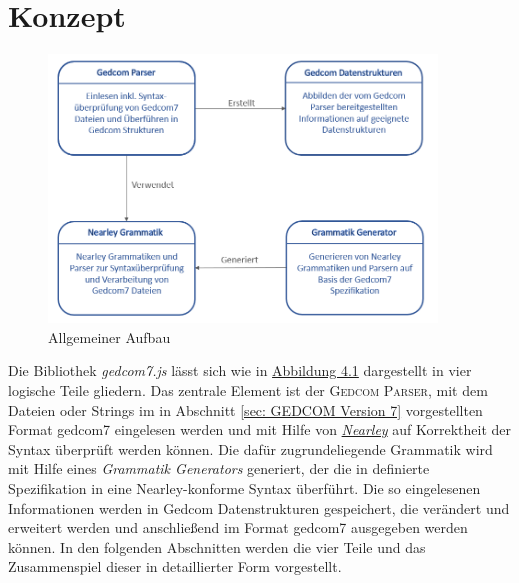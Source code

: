 \chapter{Konzept}
\label{chap: Konzept}

\begin{figure}[b]
	\centering
	\includegraphics[width=0.92\textwidth]{images/konzept_allgemein.png}
	\caption{Allgemeiner Aufbau}
	\label{fig: Allgemeiner Aufbau}
\end{figure}

Die Bibliothek \textit{gedcom7.js} lässt sich wie in \hyperref[fig: Allgemeiner Aufbau]{Abbildung 4.1} dargestellt in vier logische Teile gliedern. Das zentrale Element ist der \textsc{Gedcom Parser}, mit dem Dateien oder Strings im in Abschnitt \ref{sec: GEDCOM Version 7} vorgestellten Format gedcom7 eingelesen werden und mit Hilfe von \hyperref[sec: Nearley]{\textit{Nearley}} auf Korrektheit der Syntax überprüft werden können. Die dafür zugrundeliegende Grammatik wird mit Hilfe eines \textit{Grammatik Generators} generiert, der die in \cite{GEDCOM} definierte Spezifikation in eine Nearley-konforme Syntax überführt. Die so eingelesenen Informationen werden in Gedcom Datenstrukturen gespeichert, die verändert und erweitert werden und anschließend im Format gedcom7 ausgegeben werden können. In den folgenden Abschnitten werden die vier Teile und das Zusammenspiel dieser in detaillierter Form vorgestellt.


